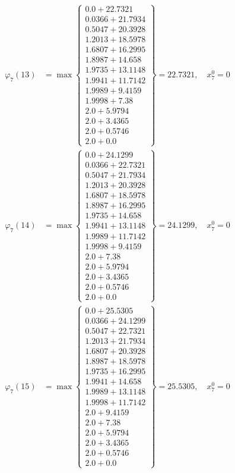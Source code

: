 \documentclass{article}
\begin{document}
\begin{align*}
\varphi_{7}(13) &= \max \left\{ \begin{array}{c}
0.0 + 22.7321 \\
 0.0366 + 21.7934 \\
 0.5047 + 20.3928 \\
 1.2013 + 18.5978 \\
 1.6807 + 16.2995 \\
 1.8987 + 14.658 \\
 1.9735 + 13.1148 \\
 1.9941 + 11.7142 \\
 1.9989 + 9.4159 \\
 1.9998 + 7.38 \\
 2.0 + 5.9794 \\
 2.0 + 3.4365 \\
 2.0 + 0.5746 \\
 2.0 + 0.0
\end{array} \right\}=22.7321, \quad x_{7}^0=0\\
  
\varphi_{7}(14) &= \max \left\{ \begin{array}{c}
0.0 + 24.1299 \\
 0.0366 + 22.7321 \\
 0.5047 + 21.7934 \\
 1.2013 + 20.3928 \\
 1.6807 + 18.5978 \\
 1.8987 + 16.2995 \\
 1.9735 + 14.658 \\
 1.9941 + 13.1148 \\
 1.9989 + 11.7142 \\
 1.9998 + 9.4159 \\
 2.0 + 7.38 \\
 2.0 + 5.9794 \\
 2.0 + 3.4365 \\
 2.0 + 0.5746 \\
 2.0 + 0.0
\end{array} \right\}=24.1299, \quad x_{7}^0=0\\
  
\varphi_{7}(15) &= \max \left\{ \begin{array}{c}
0.0 + 25.5305 \\
 0.0366 + 24.1299 \\
 0.5047 + 22.7321 \\
 1.2013 + 21.7934 \\
 1.6807 + 20.3928 \\
 1.8987 + 18.5978 \\
 1.9735 + 16.2995 \\
 1.9941 + 14.658 \\
 1.9989 + 13.1148 \\
 1.9998 + 11.7142 \\
 2.0 + 9.4159 \\
 2.0 + 7.38 \\
 2.0 + 5.9794 \\
 2.0 + 3.4365 \\
 2.0 + 0.5746 \\
 2.0 + 0.0
\end{array} \right\}=25.5305, \quad x_{7}^0=0\\
  

\end{align*}
\end{document}
